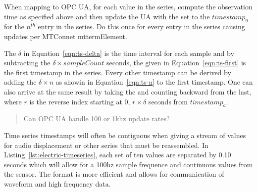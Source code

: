 When mapping  to OPC UA, for each value in the series, compute the observation time as specified above and then update the UA  with the  set to the $timestamp_n$ for the $n^{th}$ entry in the series. Do this once for every entry in the series causing  updates per MTConnet  mtterm{Element}.

The $\delta$ in Equation~\ref{eqn:ts-delta} is the time interval for each sample and by subtracting the $\delta \times sampleCount$ seconds, the given in Equation~\ref{eqn:ts-first} is the first timestamp in the series. Every other timestamp can be derived by adding the $\delta \times n$ as showin in Equation~\ref{eqn:ts-n} to the first timestamp. One can also arrive at the same result by taking the  and counting backward from the last, where $r$ is the reverse index starting at 0, $r \times \delta$ seconds from $timestamp_a$.

\begin{quote}
  \color{red} Can OPC UA handle 100 or 1khz update rates?
\end{quote}

Time series timestamps will often be contiguous when giving a stream of values for audio displacement or other series that must be reassembled. In Listing~\ref{lst:electric-timeseries}, each set of ten values are separated by 0.10 seconds which will allow for a 100hz sample frequence and continuous values from the sensor. The format is more efficient and allows for communication of waveform and high frequency data.

